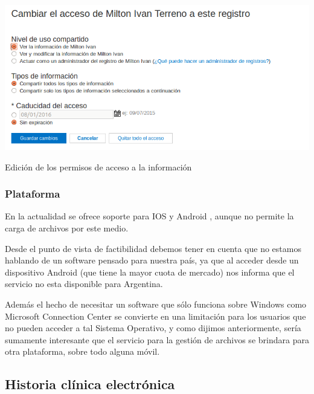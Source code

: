\begin{itemize}
{    \begin{correccionFigure}[h]
      \centering
      \includegraphics[width=.8\textwidth]{img/tp1/3-cambiar_permisos}
      \caption{Edición de los permisos de acceso a la información}
      \label{cambiar_permisos}
    \end{correccionFigure} 
}  
\clearpage
\subsubsection{Plataforma}

En la actualidad se ofrece soporte para IOS y Android , aunque no permite la carga de archivos por este medio.

	Desde el punto de vista de factibilidad debemos tener en cuenta que no estamos hablando de un software pensado para nuestra país, ya que al acceder desde un dispositivo Android (que tiene la mayor cuota de mercado)  nos informa que el servicio no esta disponible para Argentina. 
	
	Además el hecho de necesitar un software que sólo funciona sobre Windows como Microsoft Connection Center se convierte en una limitación para los usuarios que no pueden acceder a tal Sistema Operativo, y como dijimos anteriormente, sería sumamente interesante que el servicio para la gestión de archivos se brindara para otra plataforma, sobre todo alguna móvil.
\end{itemize}



\clearpage
\subsection{Historia clínica electrónica}

